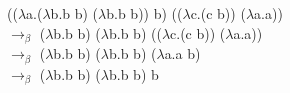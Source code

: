 \documentclass[12pt]{article}
\begin{document}
    (($\lambda$a.($\lambda$b.b b) ($\lambda$b.b b)) b) (($\lambda$c.(c b)) ($\lambda$a.a))\\
    
    $\rightarrow_{\beta}$ ($\lambda$b.b b) ($\lambda$b.b b) (($\lambda$c.(c b)) ($\lambda$a.a))\\
    
    $\rightarrow_{\beta}$ ($\lambda$b.b b) ($\lambda$b.b b) ($\lambda$a.a b)\\
    
    $\rightarrow_{\beta}$ ($\lambda$b.b b) ($\lambda$b.b b) b
    
\end{document}
